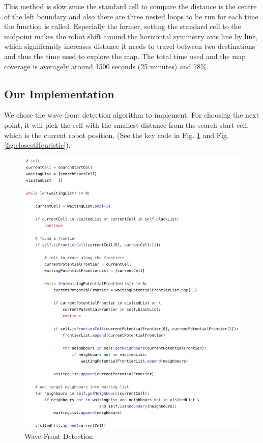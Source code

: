 \documentclass{article}
\begin{document}
This method is slow since the standard cell to compare the distance is the centre of the left boundary and also there are three nested loops to be run for each time the function is called. Especially the former, setting the standard cell to the midpoint makes the robot shift around the horizontal symmetry axis line by line, which significantly increases distance it needs to travel between two destinations and thus the time used to explore the map. The total time used and the map coverage is averagely around 1500 seconds (25 minutes) and 78\%. 

\subsection {Our Implementation}
We chose the wave front detection algorithm to implement. For choosing the next point, it will pick the cell with the smallest distance from the search start cell, which is the current robot position. (See the key code in Fig. \ref{fig:waveFrontDetection} and Fig. \ref{fig:closestHeuristic}). 

\begin{figure}[ht]
\centering
\includegraphics[scale=0.5]{graphs/part2/2-3/WaveFrontDetection.png}
\caption{Wave Front Detection}
\label{fig:waveFrontDetection}
\end{figure}
\end{document}
